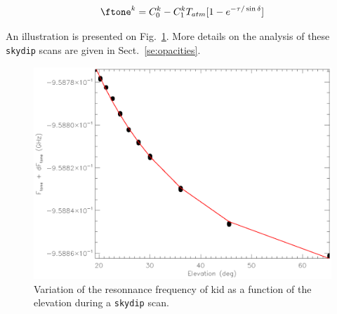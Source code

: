 \begin{equation}
\ftone^k  = C_0^k - C_1^k T_{atm}[1-e^{-\tau/\sin\delta}]
\label{eq:skydip_1}
\end{equation}

An illustration is presented on Fig.~\ref{fig:ftone_vs_elev}. More details on
the analysis of these {\tt skydip} scans are given in Sect.~\ref{se:opacities}.

\begin{figure}[ht!]
\begin{center}
  \includegraphics[clip, angle=0, scale=0.75]{Figures/skydip_report.eps}
\caption[skydip]{Variation of the resonnance frequency of kid as a function of
  the elevation during a {\tt skydip} scan.}
\label{fig:ftone_vs_elev}
\end{center}
\end{figure}

\subsection{\bms}
\label{se:beammaps}

